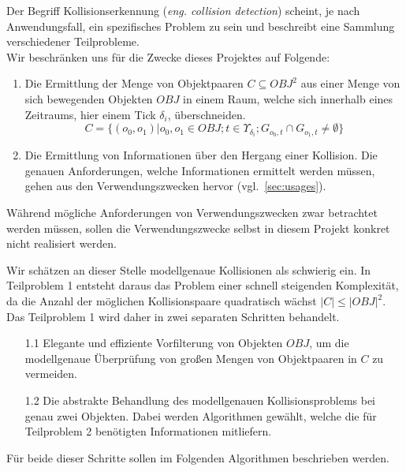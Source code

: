 Der Begriff Kollisionserkennung (\textit{eng. collision detection}) scheint, je nach Anwendungsfall, ein spezifisches Problem zu sein und beschreibt eine Sammlung verschiedener Teilprobleme.\\
Wir beschränken uns für die Zwecke dieses Projektes auf Folgende:
\begin{enumerate}
\item Die Ermittlung der Menge von Objektpaaren $C \subseteq OBJ^2$ aus einer Menge von sich bewegenden Objekten $OBJ$ in einem Raum, welche sich innerhalb eines Zeitraums, hier einem Tick $\delta_i$, überschneiden.
$$C = \{(o_0, o_1) | o_0, o_1 \in OBJ; t\in \Upsilon_{\delta_i}; G_{o_0, t} \cap G_{o_1, t} \neq \emptyset\}$$
\item Die Ermittlung von Informationen über den Hergang einer Kollision.
Die genauen Anforderungen, welche Informationen ermittelt werden müssen, gehen aus den Verwendungszwecken hervor (vgl.~\ref{sec:usages}). 
\end{enumerate}

Während mögliche Anforderungen von Verwendungszwecken zwar betrachtet werden müssen, sollen die Verwendungszwecke selbst in diesem Projekt konkret nicht realisiert werden.

Wir schätzen an dieser Stelle modellgenaue Kollisionen als schwierig ein. In Teilproblem 1 entsteht daraus das Problem einer schnell steigenden Komplexität, da die Anzahl der möglichen Kollisionspaare quadratisch wächst $|C|\leq |OBJ|^2$.\\
Das Teilproblem 1 wird daher in zwei separaten Schritten behandelt.
\begin{itemize}
\item[1.1] Elegante und effiziente Vorfilterung von Objekten $OBJ$, um die modellgenaue Überprüfung von großen Mengen von Objektpaaren in $C$ zu vermeiden.
\item[1.2] Die abstrakte Behandlung des modellgenauen Kollisionsproblems bei genau zwei Objekten. Dabei werden Algorithmen gewählt, welche die für Teilproblem 2 benötigten Informationen mitliefern.
\end{itemize}

Für beide dieser Schritte sollen im Folgenden Algorithmen beschrieben werden.\\
\\
